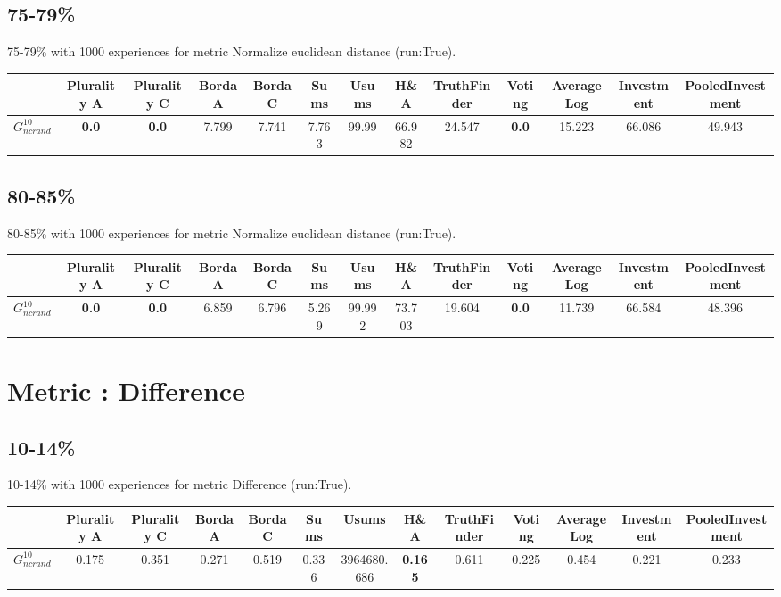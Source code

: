 \documentclass{article}
\newcommand{\graph}[2]{$G_{#1}^{#2}$}
\begin{document}
\subsection{75-79\%}

75-79\% with 1000 experiences for metric Normalize euclidean distance (run:True).

\noindent\begin{tabular}{|l|c|c|c|c|c|c|c|c|c|c|c|c|}
\hline
& Plurality A& Plurality C& Borda A& Borda C& Sums& Usums& H\&A& TruthFinder& Voting& AverageLog& Investment& PooledInvestment\\
\hline
\graph{ncrand}{10} &\textbf{0.0}&\textbf{0.0}&7.799&7.741&7.763&99.99&66.982&24.547&\textbf{0.0}&15.223&66.086&49.943\\
\hline
\end{tabular}
\newpage

\subsection{80-85\%}

80-85\% with 1000 experiences for metric Normalize euclidean distance (run:True).

\noindent\begin{tabular}{|l|c|c|c|c|c|c|c|c|c|c|c|c|}
\hline
& Plurality A& Plurality C& Borda A& Borda C& Sums& Usums& H\&A& TruthFinder& Voting& AverageLog& Investment& PooledInvestment\\
\hline
\graph{ncrand}{10} &\textbf{0.0}&\textbf{0.0}&6.859&6.796&5.269&99.992&73.703&19.604&\textbf{0.0}&11.739&66.584&48.396\\
\hline
\end{tabular}
\newpage
\newpage
\section{Metric : Difference}

\newpage

\subsection{10-14\%}

10-14\% with 1000 experiences for metric Difference (run:True).

\noindent\begin{tabular}{|l|c|c|c|c|c|c|c|c|c|c|c|c|}
\hline
& Plurality A& Plurality C& Borda A& Borda C& Sums& Usums& H\&A& TruthFinder& Voting& AverageLog& Investment& PooledInvestment\\
\hline
\graph{ncrand}{10} &0.175&0.351&0.271&0.519&0.336&3964680.686&\textbf{0.165}&0.611&0.225&0.454&0.221&0.233\\
\hline
\end{tabular}
\newpage
\end{document}
